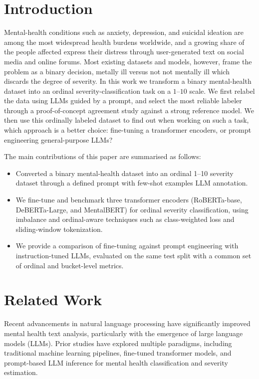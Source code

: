 \documentclass[conference]{IEEEtran}
\makeatletter
\let\end\a@l@end
\makeatother
\begin{document}
\section{Introduction}
Mental-health conditions such as anxiety, depression, and suicidal ideation are among the most widespread health burdens worldwide, and a growing share of the people affected express their distress through user-generated text on social media and online forums. Most existing datasets and models, however, frame the problem as a binary decision, metally ill versus not not mentally ill which discards the degree of severity. In this work we transform a binary mental-health dataset \cite{mahawar2025genai} into an ordinal severity-classification task on a $1$--$10$ scale. We first relabel the data using LLMs guided by a prompt, and select the most reliable labeler through a proof-of-concept agreement study against a strong reference model. We then use this ordinally labeled dataset to find out when working on such a task, which approach is a better choice: fine-tuning a transformer encoders, or prompt engineering general-purpose LLMs? 

The main contributions of this paper are summarised as follows:
\begin{itemize}
    \item Converted a binary mental-health dataset into an ordinal 1--10 severity dataset through a defined prompt with few-shot examples LLM annotation.
    \item We fine-tune and benchmark three transformer encoders
    (RoBERTa-base, DeBERTa-Large, and MentalBERT) for ordinal severity
    classification, using imbalance and ordinal-aware techniques such as
    class-weighted loss and sliding-window tokenization.
    \item We provide a comparison of fine-tuning against prompt engineering with instruction-tuned LLMs, evaluated on the same test split
    with a common set of ordinal and bucket-level metrics.
\end{itemize}

\section{Related Work}

Recent advancements in natural language processing have significantly improved mental health text analysis, particularly with the emergence of large language models (LLMs). Prior studies have explored multiple paradigms, including traditional machine learning pipelines, fine-tuned transformer models, and prompt-based LLM inference for mental health classification and severity estimation.
\end{document}
